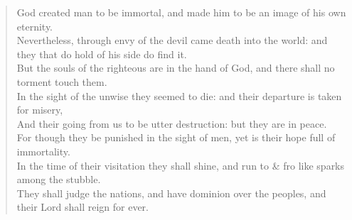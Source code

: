 \documentclass[MAIN]{subfiles}
\begin{document}
\begin{verse}
God created man to be immortal, and made him to be an image of his own eternity.\\
Nevertheless, through envy of the devil came death into the world: and they that do hold of his side do find it.\\
But the souls of the righteous are in the hand of God, and there shall no torment touch them.\\
In the sight of the unwise they seemed to die: and their departure is taken for misery,\\
And their going from us to be utter destruction: but they are in peace.\\
For though they be punished in the sight of men, yet is their hope full of immortality.\\
In the time of their visitation they shall shine, and run to \& fro like sparks among the stubble.\\
They shall judge the nations, and have dominion over the peoples, and their Lord shall reign for ever.
\end{verse}
\end{document}

